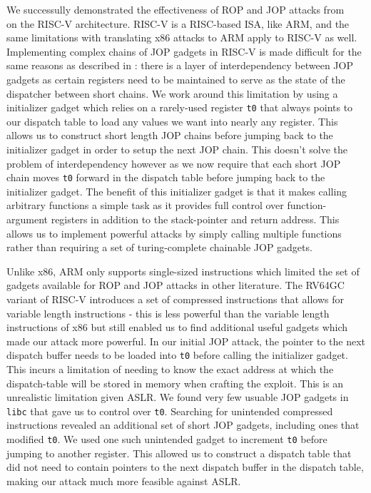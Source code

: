 We successully demonstrated the effectiveness of ROP and JOP attacks from
~\cite{checkoway10ropnoret,bletsch11jopx86,sadeghi15tinyjop} on the RISC-V
architecture. RISC-V is a RISC-based ISA, like ARM, and the same limitations
with translating x86 attacks to ARM apply to RISC-V as well. Implementing
complex chains of JOP gadgets in RISC-V is made difficult for the same reasons
as described in \cite{bletsch11jopx86}: there is a layer of interdependency
between JOP gadgets as certain registers need to be maintained to serve as the
state of the dispatcher between short chains. We work around this limitation
by using a initializer gadget which relies on a rarely-used register \verb|t0|
that always points to our dispatch table to load any values we want into nearly
any register. This allows us to construct short length JOP chains before
jumping back to the initializer gadget in order to setup the next JOP chain.
This doesn't solve the problem of interdependency however as we now require
that each short JOP chain moves \verb|t0| forward in the dispatch table before
jumping back to the initializer gadget. The benefit of this initializer
gadget is that it makes calling arbitrary functions a simple task as it provides
full control over function-argument registers in addition to the stack-pointer and
return address. This allows us to implement powerful attacks by simply calling
multiple functions rather than requiring a set of turing-complete chainable JOP gadgets.

Unlike x86, ARM only supports single-sized instructions which limited the set of
gadgets available for ROP and JOP attacks in other literature.
The RV64GC variant of RISC-V introduces a set of compressed instructions that
allows for variable length instructions - this is less powerful than the
variable length instructions of x86 but still enabled us to find additional useful
gadgets which made our attack more powerful. In our initial JOP attack, the pointer
to the next dispatch buffer needs to be loaded into \verb|t0| before calling the
initializer gadget. This incurs a limitation of needing to know the exact
address at which the dispatch-table will be stored in memory when crafting the exploit.
This is an unrealistic limitation given ASLR. We found very few usuable JOP gadgets in
\verb|libc| that gave us to control over \verb|t0|. Searching for unintended
compressed instructions revealed an additional set of short JOP gadgets, including ones
that modified \verb|t0|. We used one such unintended gadget to increment \verb|t0|
before jumping to another register. This allowed us to construct a dispatch table that
did not need to contain pointers to the next dispatch buffer in the dispatch table,
making our attack much more feasible against ASLR.

